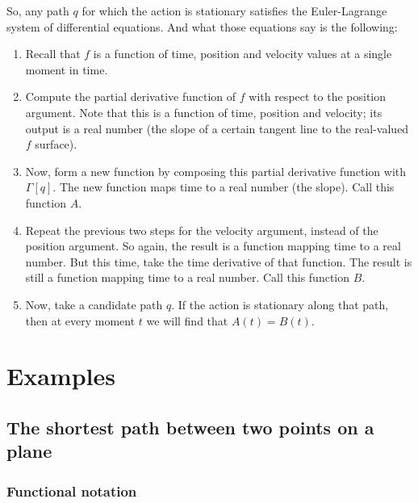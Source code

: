 So, any path $q$ for which the action is stationary satisfies the Euler-Lagrange system of differential
equations. And what those equations say is the following:
\begin{enumerate}
\item Recall that $f$ is a function of time, position and velocity values at a single moment in time.

\item Compute the partial derivative function of $f$ with respect to the position argument. Note that this is a
  function of time, position and velocity; its output is a real number (the slope of a certain tangent line to
  the real-valued $f$ surface).

\item Now, form a new function by composing this partial derivative function with $\Gamma[q]$. The new function
  maps time to a real number (the slope). Call this function $A$.

\item Repeat the previous two steps for the velocity argument, instead of the position argument. So again, the
  result is a function mapping time to a real number. But this time, take the time derivative of that
  function. The result is still a function mapping time to a real number. Call this function $B$.

\item Now, take a candidate path $q$. If the action is stationary along that path, then at every moment $t$ we will
  find that $A(t) = B(t)$.
\end{enumerate}

\section{Examples}

\subsection{The shortest path between two points on a plane}

\subsubsection{Functional notation}

\begin{question*}

\end{question*}

